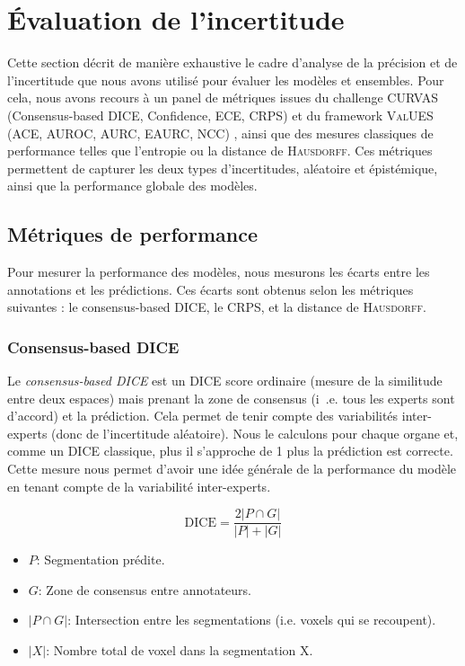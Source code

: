 \documentclass[a4paper,french,bookmarks,12pt]{article}
\begin{document}
    \section{Évaluation de l'incertitude}

    Cette section décrit de manière exhaustive le cadre d'analyse de la précision et de l'incertitude que nous avons utilisé pour évaluer les modèles et ensembles. Pour cela, nous avons recours à un panel de métriques issues du challenge \textsc{CURVAS} (Consensus-based DICE, Confidence, ECE, CRPS) \parencite{curvas} et du framework \textsc{ValUES} (ACE, AUROC, AURC, EAURC, NCC) \parencite{values}, ainsi que des mesures classiques de performance telles que l'entropie ou la distance de \textsc{Hausdorff}. Ces métriques permettent de capturer les deux types d'incertitudes, aléatoire et épistémique, ainsi que la performance globale des modèles.

    \subsection{Métriques de performance}

    Pour mesurer la performance des modèles, nous mesurons les écarts entre les annotations et les prédictions. Ces écarts sont obtenus selon les métriques suivantes : le consensus-based DICE, le CRPS, et la distance de \textsc{Hausdorff}.
    
    \subsubsection*{Consensus-based DICE}

    Le \emph{consensus-based DICE} est un DICE score ordinaire (mesure de la similitude entre deux espaces) mais prenant la zone de consensus (i~.e. tous les experts sont d'accord) et la prédiction. Cela permet de tenir compte des variabilités inter-experts (donc de l'incertitude aléatoire). Nous le calculons pour chaque organe et, comme un DICE classique, plus il s'approche de 1 plus la prédiction est correcte. Cette mesure nous permet d'avoir une idée générale de la performance du modèle en tenant compte de la variabilité inter-experts.
        
    \[ \text{DICE} = \frac{2 |P \cap G|}{|P| + |G|} \]
    
    \begin{itemize} 
        \item \( P \): Segmentation prédite.
        \item \( G \): Zone de consensus entre annotateurs.
        \item \( |P \cap G| \): Intersection entre les segmentations (i.e. voxels qui se recoupent).
        \item \( |X| \): Nombre total de voxel dans la segmentation X.    
    \end{itemize}
    
\end{document}
